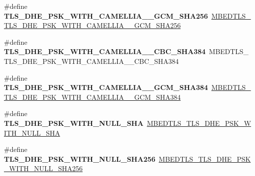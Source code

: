 \begin{DoxyCompactItemize}
\item 
\mbox{\label{compat-1_83_8h_ae923d24b17aff8b1e9813e145cabb68e}} 
\#define {\bfseries T\+L\+S\+\_\+\+D\+H\+E\+\_\+\+P\+S\+K\+\_\+\+W\+I\+T\+H\+\_\+\+C\+A\+M\+E\+L\+L\+I\+A\+\_\+\_\+\+G\+C\+M\+\_\+\+S\+H\+A256}~\mbox{\hyperlink{ssl__ciphersuites_8h_a39dccefc320d51ab8a75a685cc2518fd}{M\+B\+E\+D\+T\+L\+S\+\_\+\+T\+L\+S\+\_\+\+D\+H\+E\+\_\+\+P\+S\+K\+\_\+\+W\+I\+T\+H\+\_\+\+C\+A\+M\+E\+L\+L\+I\+A\+\_\+\_\+\+G\+C\+M\+\_\+\+S\+H\+A256}}
\item 
\mbox{\label{compat-1_83_8h_a5674addff7499f07a9934909cae3e58f}} 
\#define {\bfseries T\+L\+S\+\_\+\+D\+H\+E\+\_\+\+P\+S\+K\+\_\+\+W\+I\+T\+H\+\_\+\+C\+A\+M\+E\+L\+L\+I\+A\+\_\+\_\+\+C\+B\+C\+\_\+\+S\+H\+A384}~M\+B\+E\+D\+T\+L\+S\+\_\+\+T\+L\+S\+\_\+\+D\+H\+E\+\_\+\+P\+S\+K\+\_\+\+W\+I\+T\+H\+\_\+\+C\+A\+M\+E\+L\+L\+I\+A\+\_\+\_\+\+C\+B\+C\+\_\+\+S\+H\+A384
\item 
\mbox{\label{compat-1_83_8h_a131d79c1f993c51a17d6400ad1fb8c00}} 
\#define {\bfseries T\+L\+S\+\_\+\+D\+H\+E\+\_\+\+P\+S\+K\+\_\+\+W\+I\+T\+H\+\_\+\+C\+A\+M\+E\+L\+L\+I\+A\+\_\+\_\+\+G\+C\+M\+\_\+\+S\+H\+A384}~\mbox{\hyperlink{ssl__ciphersuites_8h_a2b86788e1428d40e77e787c4c42146d4}{M\+B\+E\+D\+T\+L\+S\+\_\+\+T\+L\+S\+\_\+\+D\+H\+E\+\_\+\+P\+S\+K\+\_\+\+W\+I\+T\+H\+\_\+\+C\+A\+M\+E\+L\+L\+I\+A\+\_\+\_\+\+G\+C\+M\+\_\+\+S\+H\+A384}}
\item 
\mbox{\label{compat-1_83_8h_a5da1692031a54d9f9b94ca90e6c5cc7f}} 
\#define {\bfseries T\+L\+S\+\_\+\+D\+H\+E\+\_\+\+P\+S\+K\+\_\+\+W\+I\+T\+H\+\_\+\+N\+U\+L\+L\+\_\+\+S\+HA}~\mbox{\hyperlink{ssl__ciphersuites_8h_a81f07914d0180154bd3c81846a4e3fb4}{M\+B\+E\+D\+T\+L\+S\+\_\+\+T\+L\+S\+\_\+\+D\+H\+E\+\_\+\+P\+S\+K\+\_\+\+W\+I\+T\+H\+\_\+\+N\+U\+L\+L\+\_\+\+S\+HA}}
\item 
\mbox{\label{compat-1_83_8h_a743784f911cb5e8629671cdcb26d0b94}} 
\#define {\bfseries T\+L\+S\+\_\+\+D\+H\+E\+\_\+\+P\+S\+K\+\_\+\+W\+I\+T\+H\+\_\+\+N\+U\+L\+L\+\_\+\+S\+H\+A256}~\mbox{\hyperlink{ssl__ciphersuites_8h_a7c208c375741c2b6c25f09c78bf03551}{M\+B\+E\+D\+T\+L\+S\+\_\+\+T\+L\+S\+\_\+\+D\+H\+E\+\_\+\+P\+S\+K\+\_\+\+W\+I\+T\+H\+\_\+\+N\+U\+L\+L\+\_\+\+S\+H\+A256}}
\item 
\mbox{\label{compat-1_83_8h_af4cb89c1b228da32eba92c1e40ec6ad3}} 

\end{DoxyCompactItemize}
